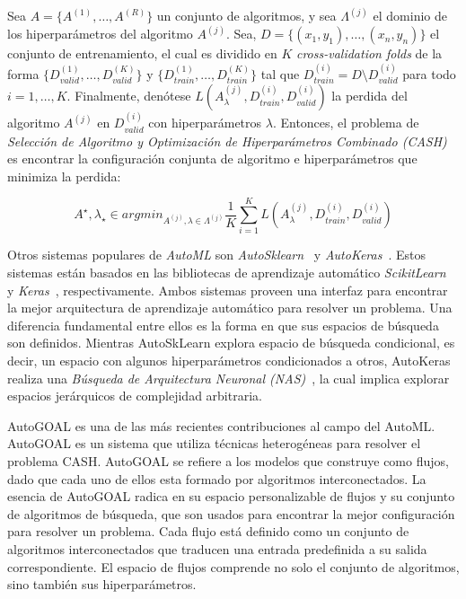 \begin{definition}
\label{definition:cash}
    Sea $A = \{A^{(1)}, \dots, A^{(R)}\}$ un conjunto de algoritmos, y sea $\Lambda^{(j)}$ el dominio de los hiperparámetros del algoritmo $A^{(j)}$.
    Sea, $D = \{(x_1, y_1), \dots, (x_n, y_n)\}$ el conjunto de entrenamiento, el cual es dividido en $K$ \emph{cross-validation folds} de la forma $\{D_{valid}^{(1)}, \dots, D_{valid}^{(K)}\}$ y $\{D_{train}^{(1)}, \dots, D_{train}^{(K)}\}$ tal que $D_{train}^{(i)} = D \setminus D_{valid}^{(i)}$ para todo $i = 1, \dots, K$. Finalmente, denótese $L(A_{\lambda}^{(j)}, D_{train}^{(i)},D_{valid}^{(i)})$ la perdida del algoritmo $A^{(j)}$ en $D_{valid}^{(i)}$ con hiperparámetros $\lambda$.
    Entonces, el problema de \textit{Selección de Algoritmo y Optimización de Hiperparámetros Combinado (CASH)} es encontrar la configuración conjunta de algoritmo e hiperparámetros que minimiza la perdida:

    \begin{equation}
        A^{\star}, \lambda_{\star} \in argmin_{A^{(j)}, \lambda \in \Lambda^(j)} \frac{1}{K} \sum_{i=1}^K L(A_{\lambda}^{(j)}, D_{train}^{(i)},D_{valid}^{(i)})
    \end{equation}
\end{definition}

Otros sistemas populares de \emph{AutoML} son \emph{AutoSklearn}~\parencite{feurer2015efficient} y \emph{AutoKeras}~\parencite{autoKeras}.
Estos sistemas están basados en las bibliotecas de aprendizaje automático \emph{ScikitLearn}~\parencite{pedregosa2011scikit} y \textit{Keras}~\parencite{chollet2015keras}, respectivamente.
Ambos sistemas proveen una interfaz para encontrar la mejor arquitectura de aprendizaje automático para resolver un problema.
Una diferencia fundamental entre ellos es la forma en que sus espacios de búsqueda son definidos.
Mientras AutoSkLearn explora espacio de búsqueda condicional, es decir, un espacio con algunos hiperparámetros condicionados a otros, AutoKeras realiza una \emph{Búsqueda de Arquitectura Neuronal (NAS)}~\parencite{NAS}, la cual implica explorar espacios jerárquicos de complejidad arbitraria.

AutoGOAL \parencite{autogoal, estevez2020general} es una de las más recientes contribuciones al campo del AutoML. AutoGOAL es un sistema que utiliza técnicas heterogéneas para resolver el problema CASH.
AutoGOAL se refiere a los modelos que construye como flujos, dado que cada uno de ellos esta formado por algoritmos interconectados.
La esencia de AutoGOAL radica en su espacio personalizable de flujos y su conjunto de algoritmos de búsqueda, que son usados para encontrar la mejor configuración para resolver un problema.
Cada flujo está definido como un conjunto de algoritmos interconectados que traducen una entrada predefinida a su salida correspondiente.
El espacio de flujos comprende no solo el conjunto de algoritmos, sino también sus hiperparámetros.

